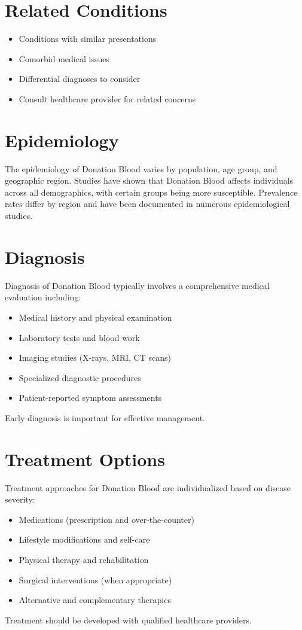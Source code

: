 \section*{Related Conditions}
\begin{itemize}
  \item Conditions with similar presentations
  \item Comorbid medical issues
  \item Differential diagnoses to consider
  \item Consult healthcare provider for related concerns
\end{itemize}

\section*{Epidemiology}
The epidemiology of Donation Blood varies by population, age group, and geographic region. Studies have shown that Donation Blood affects individuals across all demographics, with certain groups being more susceptible. Prevalence rates differ by region and have been documented in numerous epidemiological studies.

\section*{Diagnosis}
Diagnosis of Donation Blood typically involves a comprehensive medical evaluation including:
\begin{itemize}
  \item Medical history and physical examination
  \item Laboratory tests and blood work
  \item Imaging studies (X-rays, MRI, CT scans)
  \item Specialized diagnostic procedures
  \item Patient-reported symptom assessments
\end{itemize}
Early diagnosis is important for effective management.

\section*{Treatment Options}
Treatment approaches for Donation Blood are individualized based on disease severity:
\begin{itemize}
  \item Medications (prescription and over-the-counter)
  \item Lifestyle modifications and self-care
  \item Physical therapy and rehabilitation
  \item Surgical interventions (when appropriate)
  \item Alternative and complementary therapies
\end{itemize}
Treatment should be developed with qualified healthcare providers.

